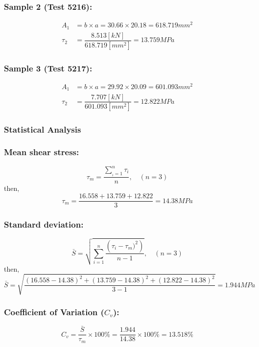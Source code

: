 \subsubsection*{Sample 2 (Test 5216):}
\begin{align*}
A_1 & = b \times a = 30.66 \times 20.18 = 618.719 mm^2  \\
\tau_2 & = \dfrac{8.513 [kN]}{618.719 [mm^2]} =13.759 MPa
\end{align*}

\subsubsection*{Sample 3 (Test 5217):}
\begin{align*}
A_1 & = b \times a = 29.92 \times 20.09 = 601.093 mm^2  \\
\tau_2 & = \dfrac{7.707 [kN]}{601.093 [mm^2]} =12.822 MPa
\end{align*}

\subsubsection{Statistical Analysis}
\label{statistical analysis}
\subsubsection*{Mean shear stress:}
\[\tau_m = \dfrac{\sum_{_i=1}^n \tau_i}{n}, \quad (n=3)\]
then, \[\tau_m = \dfrac{16.558 + 13.759 + 12.822}{3} = \boxed{14.38 MPa}\]

\subsubsection*{Standard deviation:}
\[\bar{S} = \sqrt{\sum_{i=1}^{n} \dfrac{\left(\tau_i - \tau_m)^2 \right)}{n -1}}, \quad (n =3)\]
then, \[\bar{S} = \sqrt{\dfrac{(16.558-14.38)^2 + (13.759-14.38)^2+(12.822-14.38)^2}{3-1}}  = \boxed{1.944 MPa}\]

\subsubsection*{Coefficient of Variation ($C_v$):}
\[C_v = \dfrac{\bar{S}}{\tau_m} \times 100\% = \dfrac{1.944}{14.38}\times 100\% = \boxed{13.518 \%}\]

